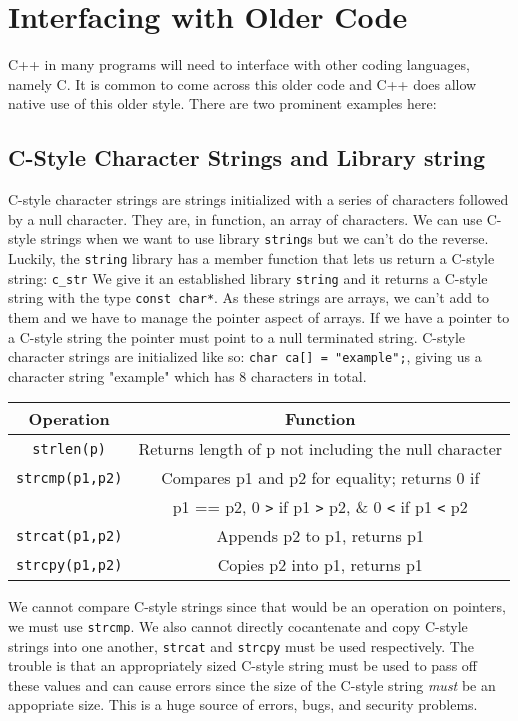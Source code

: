 \documentclass[12pt, a4paper]{report}
\begin{document}
\section{Interfacing with Older Code}
C++ in many programs will need to interface with other coding languages, namely C.
It is common to come across this older code and C++ does allow native use of this older style.
There are two prominent examples here:
\subsection{C-Style Character Strings and Library string}
C-style character strings are strings initialized with a series of characters followed by a null character.
They are, in function, an array of characters.
We can use C-style strings when we want to use library \verb|string|s but we can't do the reverse.
Luckily, the \verb|string| library has a member function that lets us return a C-style string: \verb|c_str|
We give it an established library \verb|string| and it returns a C-style string with the type \verb|const char*|.
As these strings are arrays, we can't add to them and we have to manage the pointer aspect of arrays.
If we have a pointer to a C-style string the pointer must point to a null terminated string.
C-style character strings are initialized like so: \verb|char ca[] = "example";|,
giving us a character string "example" which has 8 characters in total.
\begin{center}
	\begin{tabular}{ |c|c| }
		\hline
		\textbf{Operation} & \textbf{Function} \\
		\hline
		\verb|strlen(p)| & Returns length of p not including the null character \\
		\hline
		\verb|strcmp(p1,p2)| & Compares p1 and p2 for equality; returns 0 if \\
				     & p1 == p2, 0 \verb|>| if p1 \verb|>| p2, \& 0 \verb|<| if p1 \verb|<| p2 \\
		\hline
		\verb|strcat(p1,p2)| & Appends p2 to p1, returns p1 \\
		\hline
		\verb|strcpy(p1,p2)| & Copies p2 into p1, returns p1 \\
		\hline
	\end{tabular}
\end{center}
We cannot compare C-style strings since that would be an operation on pointers, we must use \verb|strcmp|.
We also cannot directly cocantenate and copy C-style strings into one another, \verb|strcat| and \verb|strcpy| must be used respectively.
The trouble is that an appropriately sized C-style string must be used to pass off these values and can cause errors since the 
size of the C-style string \emph{must} be an appopriate size.
This is a huge source of errors, bugs, and security problems.
\end{document}
